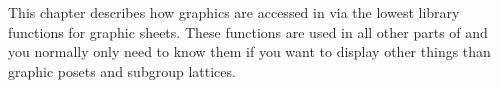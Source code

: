 
This chapter describes how graphics are accessed in {\XGAP} via the lowest
library functions for graphic sheets. These functions are used in all other 
parts of {\XGAP} and you normally only need to know them if you want to
display other things than graphic posets and subgroup lattices.



